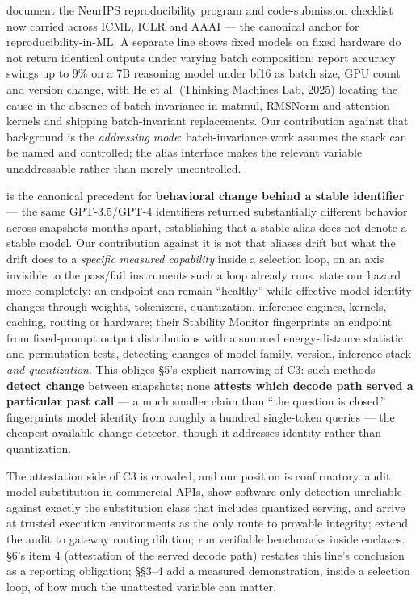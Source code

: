 \citet{pineau2021reproducibility} document the NeurIPS reproducibility program and code-submission checklist now carried across ICML, ICLR and AAAI --- the canonical anchor for reproducibility-in-ML. A separate line shows fixed models on fixed hardware do not return identical outputs under varying batch composition: \citet{yuan2025understandingmitigatingnumericalsources} report accuracy swings up to 9\% on a 7B reasoning model under bf16 as batch size, GPU count and version change, with He et al. (Thinking Machines Lab, 2025) locating the cause in the absence of batch-invariance in matmul, RMSNorm and attention kernels and shipping batch-invariant replacements. Our contribution against that background is the \emph{addressing mode}: batch-invariance work assumes the stack can be named and controlled; the alias interface makes the relevant variable unaddressable rather than merely uncontrolled.

\citet{chen2023chatgptsbehaviorchangingtime} is the canonical precedent for \textbf{behavioral change behind a stable identifier} --- the same GPT-3.5/GPT-4 identifiers returned substantially different behavior across snapshots months apart, establishing that a stable alias does not denote a stable model. Our contribution against it is not that aliases drift but what the drift does to a \emph{specific measured capability} inside a selection loop, on an axis invisible to the pass/fail instruments such a loop already runs. \citet{leshin2026behavioralfingerprintsllmendpoint} state our hazard more completely: an endpoint can remain ``healthy'' while effective model identity changes through weights, tokenizers, quantization, inference engines, kernels, caching, routing or hardware; their Stability Monitor fingerprints an endpoint from fixed-prompt output distributions with a summed energy-distance statistic and permutation tests, detecting changes of model family, version, inference stack \emph{and quantization}. This obliges \S5's explicit narrowing of C3: such methods \textbf{detect change} between snapshots; none \textbf{attests which decode path served a particular past call} --- a much smaller claim than ``the question is closed.'' \citet{bruckner2026tokenenoughfingerprintingverifying} fingerprints model identity from roughly a hundred single-token queries --- the cheapest available change detector, though it addresses identity rather than quantization.

The attestation side of C3 is crowded, and our position is confirmatory. \citet{cai2025gettingpayforauditing} audit model substitution in commercial APIs, show software-only detection unreliable against exactly the substitution class that includes quantized serving, and arrive at trusted execution environments as the only route to provable integrity; \citet{zhang2026modelactuallyservingyou} extend the audit to gateway routing dilution; \citet{schnabl2025attestableauditsverifiableai} run verifiable benchmarks inside enclaves. \S6's item 4 (attestation of the served decode path) restates this line's conclusion as a reporting obligation; \S\S3--4 add a measured demonstration, inside a selection loop, of how much the unattested variable can matter.

